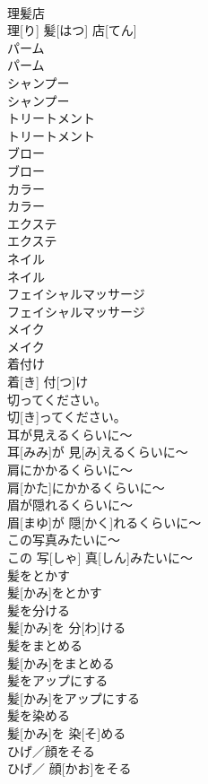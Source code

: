 \documentclass[8pt]{extreport}
\begin{document}
\begin{CJK}{UTF8}{min}
\\	理髪店	
\\	理[り] 髪[はつ] 店[てん]		
\\	パーム	
\\	パーム		
\\	シャンプー	
\\	シャンプー		
\\	トリートメント	
\\	トリートメント		
\\	ブロー	
\\	ブロー		
\\	カラー	
\\	カラー		
\\	エクステ	
\\	エクステ		
\\	ネイル	
\\	ネイル		
\\	フェイシャルマッサージ	
\\	フェイシャルマッサージ		
\\	メイク	
\\	メイク		
\\	着付け	
\\	着[き] 付[つ]け		
\\	切ってください。	
\\	切[き]ってください。		
\\	耳が見えるくらいに～	
\\	耳[みみ]が 見[み]えるくらいに～		
\\	肩にかかるくらいに～	
\\	肩[かた]にかかるくらいに～		
\\	眉が隠れるくらいに～	
\\	眉[まゆ]が 隠[かく]れるくらいに～		
\\	この写真みたいに～	
\\	この 写[しゃ] 真[しん]みたいに～		
\\	髪をとかす	
\\	髪[かみ]をとかす		
\\	髪を分ける	
\\	髪[かみ]を 分[わ]ける		
\\	髪をまとめる	
\\	髪[かみ]をまとめる		
\\	髪をアップにする	
\\	髪[かみ]をアップにする		
\\	髪を染める	
\\	髪[かみ]を 染[そ]める		
\\	ひげ／顔をそる	
\\	ひげ／ 顔[かお]をそる		

\end{CJK}
\end{document}

